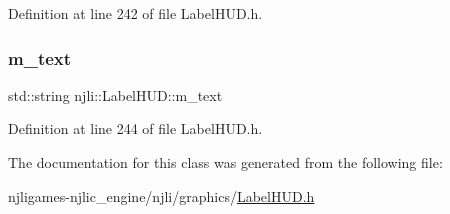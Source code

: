 Definition at line 242 of file Label\+H\+U\+D.\+h.

\mbox{\label{classnjli_1_1_label_h_u_d_a0e917cde3ec783326e76033b11a6a0d4}} 
\subsubsection{\texorpdfstring{m\+\_\+text}{m\_text}}
{\footnotesize\ttfamily std\+::string njli\+::\+Label\+H\+U\+D\+::m\+\_\+text\hspace{0.3cm}{\ttfamily [private]}}



Definition at line 244 of file Label\+H\+U\+D.\+h.



The documentation for this class was generated from the following file\+:\begin{DoxyCompactItemize}
\item 
njligames-\/njlic\+\_\+engine/njli/graphics/\mbox{\hyperlink{_label_h_u_d_8h}{Label\+H\+U\+D.\+h}}\end{DoxyCompactItemize}
